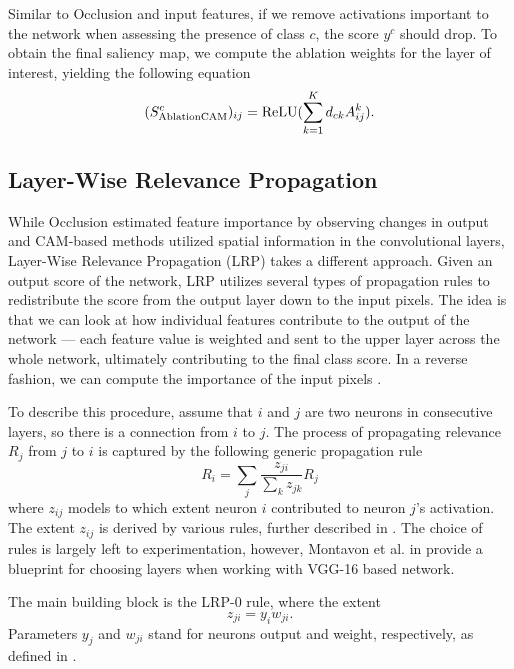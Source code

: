 Similar to Occlusion and input features, if we remove activations important to the network when assessing the presence of class $c$, the score $y^c$ should drop. To obtain the final saliency map, we compute the ablation weights for the layer of interest, yielding the following equation
\begin{equation}
    (S^c_{\text{AblationCAM}})_{ij} = \operatorname{ReLU}(\sum_{k=1}^K d_{ck} A^k_{ij}).
\end{equation}

\subsection{Layer-Wise Relevance Propagation}

While Occlusion estimated feature importance by observing changes in output and CAM-based methods utilized spatial information in the convolutional layers, Layer-Wise Relevance Propagation (LRP) \cite{lrp} takes a different approach.
Given an output score of the network, LRP utilizes several types of propagation rules to redistribute the score from the output layer down to the input pixels.
The idea is that we can look at how individual features contribute to the output of the network --- each feature value is weighted and sent to the upper layer across the whole network, ultimately contributing to the final class score.
In a reverse fashion, we can compute the importance of the input pixels \cite{lrp}.

To describe this procedure, assume that $i$ and $j$ are two neurons in consecutive layers, so there is a connection from $i$ to $j$. 
The process of propagating relevance $R_j$ from $j$ to $i$ is captured by the following generic propagation rule \cite{lrp}
\begin{equation}
    R_i = \sum_j \frac{z_{ji}}{\sum_k z_{jk}} R_j
\end{equation}
where $z_{ij}$ models to which extent neuron $i$ contributed to neuron $j$'s activation.
The extent $z_{ij}$ is derived by various rules, further described in \cite{lrp}.
The choice of rules is largely left to experimentation, however, Montavon et al. in \cite{lrp} provide a blueprint for choosing layers when working with VGG-16 based network.

The main building block is the LRP-$0$ rule, where the extent
\begin{equation}
    z_{ji} = y_i w_{ji}.
\end{equation}
Parameters $y_j$ and $w_{ji}$ stand for neurons output and weight, respectively, as defined in .


